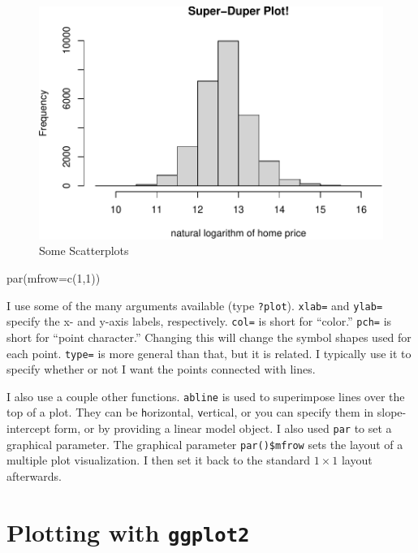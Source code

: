 \documentclass[
  12pt,
]{krantz}
\makeatletter
\newenvironment{Shaded}{\begin{snugshade}}{\end{snugshade}}
\newcommand{\AttributeTok}[1]{\textcolor[rgb]{0.61,0.61,0.61}{#1}}
\newcommand{\DecValTok}[1]{\textcolor[rgb]{0.06,0.06,0.06}{#1}}
\newcommand{\FunctionTok}[1]{\textcolor[rgb]{0,0,0}{#1}}
\newcommand{\NormalTok}[1]{#1}
\newenvironment{kframe}{%
\medskip{}
\setlength{\fboxsep}{.8em}
 \def\at@end@of@kframe{}%
 \ifinner\ifhmode%
  \def\at@end@of@kframe{\end{minipage}}%
  \begin{minipage}{\columnwidth}%
 \fi\fi%
 \def\FrameCommand##1{\hskip\@totalleftmargin \hskip-\fboxsep
 \colorbox{shadecolor}{##1}\hskip-\fboxsep
     \hskip-\linewidth \hskip-\@totalleftmargin \hskip\columnwidth}%
 \MakeFramed {\advance\hsize-\width
   \@totalleftmargin\z@ \linewidth\hsize
   \@setminipage}}%
 {\par\unskip\endMakeFramed%
 \at@end@of@kframe}
\renewenvironment{Shaded}{\begin{kframe}}{\end{kframe}}
\makeatother
\begin{document}
\begin{figure}
\centering
\includegraphics{r_and_python_book_files/figure-latex/unnamed-chunk-167-1.pdf}
\caption{\label{fig:unnamed-chunk-167}Some Scatterplots}
\end{figure}

\begin{Shaded}
\begin{Highlighting}[]
\FunctionTok{par}\NormalTok{(}\AttributeTok{mfrow=}\FunctionTok{c}\NormalTok{(}\DecValTok{1}\NormalTok{,}\DecValTok{1}\NormalTok{))}
\end{Highlighting}
\end{Shaded}

I use some of the many arguments available (type \texttt{?plot}). \texttt{xlab=} and \texttt{ylab=} specify the x- and y-axis labels, respectively. \texttt{col=} is short for ``color.'' \texttt{pch=} is short for ``point character.'' Changing this will change the symbol shapes used for each point. \texttt{type=} is more general than that, but it is related. I typically use it to specify whether or not I want the points connected with lines.

I also use a couple other functions. \texttt{abline} is used to superimpose lines over the top of a plot. They can be \texttt{h}orizontal, \texttt{v}ertical, or you can specify them in slope-intercept form, or by providing a linear model object. I also used \texttt{par} to set a graphical parameter. The graphical parameter \texttt{par()\$mfrow} sets the layout of a multiple plot visualization. I then set it back to the standard \(1 \times 1\) layout afterwards.

\hypertarget{plotting-with-ggplot2}{%
\section{\texorpdfstring{Plotting with \texttt{ggplot2}}{Plotting with ggplot2}}\label{plotting-with-ggplot2}}
\end{document}
